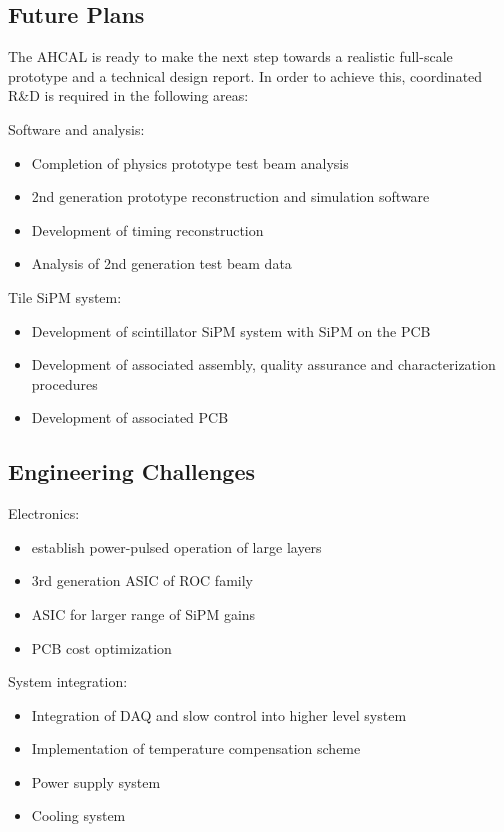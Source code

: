 \subsection{Future Plans}

The AHCAL is ready to make the next step towards a realistic full-scale prototype and a technical design report. In order to achieve this, coordinated R\&D is required in the following areas:

Software and analysis:
\begin{itemize}
\item Completion of physics prototype test beam analysis
\item 2nd generation prototype reconstruction and simulation software
\item Development of timing reconstruction
\item Analysis of 2nd generation test beam data
\end{itemize}

Tile SiPM system:
\begin{itemize}
\item Development of scintillator SiPM system with SiPM on the PCB
\item Development of associated assembly, quality assurance and characterization procedures
\item Development of associated PCB
\end{itemize}

\subsection{Engineering Challenges}

Electronics:
\begin{itemize}
\item establish power-pulsed operation of large layers
\item 3rd generation ASIC of ROC family
\item ASIC for larger range of SiPM gains
\item PCB cost optimization
\end{itemize}

System integration:
\begin{itemize}
\item Integration of DAQ and slow control into higher level system
\item Implementation of temperature compensation scheme
\item Power supply system
\item Cooling system
\end{itemize}

